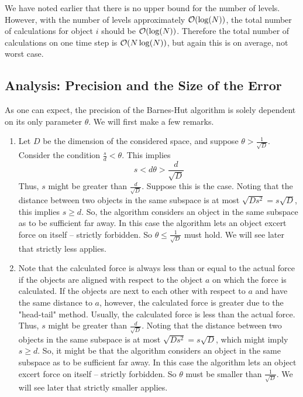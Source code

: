 We have noted earlier that there is no upper bound for the number of levels. However, with the number of levels approximately $\mathcal{O}(\log(N))$, the total number of calculations for object $i$ should be $\mathcal{O}(\log(N))$. Therefore the total number of calculations on one time step is $\mathcal{O}(N\log(N))$, but again this is on average, not worst case.
\subsection{Analysis: Precision and the Size of the Error}
As one can expect, the precision of the Barnes-Hut algorithm is solely dependent on its only parameter $\theta$. We will first make a few remarks.
\begin{enumerate}
\item Let $D$ be the dimension of the considered space, and suppose $\theta > \frac{1}{\sqrt{D}}$. Consider the condition $\frac{s}{d} < \theta$. This implies
\[
s < d\theta > \frac{d}{\sqrt{D}}
\]
Thus, $s$ might be greater than $\frac{d}{\sqrt{D}}$. Suppose this is the case. Noting that the distance between two objects in the same subspace is at most $\sqrt{Ds^2} = s\sqrt{D}$, this implies $s\geq d$. So, the algorithm considers an object in the same subspace as to be sufficient far away. In this case the algorithm lets an object excert force on itself -- strictly forbidden. So $\theta \leq \frac{1}{\sqrt{D}}$ must hold. We will see later that strictly less applies.
\item Note that the calculated force is always less than or equal to the actual force if the objects are aligned with respect to the object $a$ on which the force is calculated. If the objects are next to each other with respect to $a$ and have the same distance to $a$, however, the calculated force is greater due to the "head-tail" method. Usually, the calculated force is less than the actual force.
Thus, $s$ might be greater than $\frac{d}{\sqrt{D}}$. Noting that the distance between two objects in the same subspace is at most $\sqrt{Ds^2} = s\sqrt{D}$, which might imply $s\geq d$. So, it might be that the algorithm considers an object in the same subspace as to be sufficient far away. In this case the algorithm lets an object excert force on itself -- strictly forbidden. So $\theta$ must be smaller than $\frac{1}{\sqrt{D}}$. We will see later that strictly smaller applies.


\end{enumerate}
